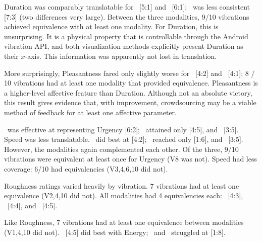     Duration was comparably translatable for \lofi\ [5:1] and \linear\ [6:1]; \original\ was less consistent [7:3] (two differences very large).
    Between the three modalities, 9/10 vibrations achieved equivalence with at least one modality.
    For Duration, this is unsurprising. It is a physical property that is controllable through the Android vibration API, and both visualization methods explicitly present Duration as their $x$-axis. %
    This information was apparently not lost in translation.
    
    More surprisingly, Pleasantness fared only slightly worse for \lofi\ [4:2]
    and \linear\ [4:1]; 8 / 10 vibrations had at least one modality that provided equivalence.
     Pleasantness is a higher-level affective feature than Duration.
     Although not an absolute victory, this result gives evidence that, with improvement, crowdsourcing may be a viable method of feedback for at least one affective parameter.
    
    	\lofi\ was  effective at representing Urgency [6:2]; \linear\ attained only  [4:5], and \original\ [3:5].
	Speed was less translatable. \lofi~did best at [4:2];
	\original~reached only [1:6], and \linear~[3:5].
	However, the modalities again complemented each other.
	Of the three, 9/10 vibrations were equivalent at least once for Urgency (V8 was not).
	Speed had less coverage: 6/10 had equivalencies (V3,4,6,10 did not).
	
    Roughness ratings varied heavily by vibration.
    7 vibrations had at least one equivalence (V2,4,10 did not).
    All modalities had 4 equivalencies each:
    \linear\ [4:3], \original\ [4:4], and \lofi\ [4:5]. 
    
          Like Roughness, 7 vibrations had at least one equivalence  between  modalities (V1,4,10 did not).
          \lofi\ [4:5] did best with Energy;
          \linear\ and \original\ struggled at [1:8]. 
          
